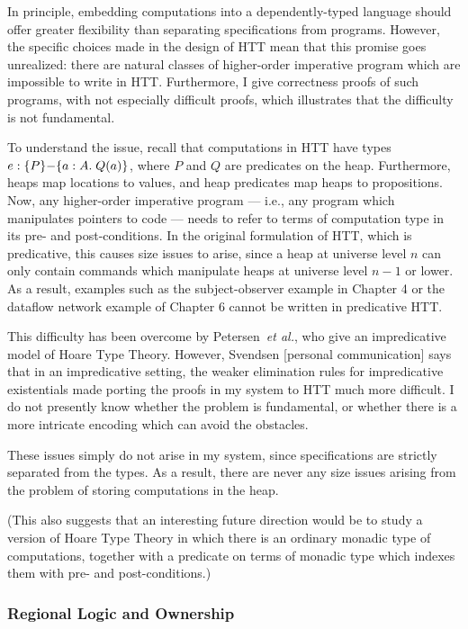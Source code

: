 In principle, embedding computations into a dependently-typed language
should offer greater flexibility than separating specifications from
programs. However, the specific choices made in the design of HTT mean
that this promise goes unrealized: there are natural classes of
higher-order imperative program which are impossible to write in
HTT. Furthermore, I give correctness proofs of such programs, with not
especially difficult proofs, which illustrates that the difficulty is
not fundamental.

To understand the issue, recall that computations in HTT have types $e
: \{{P}\}{-}\{{a:A}.\;{Q(a)}\}$, where $P$ and $Q$ are predicates on the
heap. Furthermore, heaps map locations to values, and heap predicates
map heaps to propositions. Now, any higher-order imperative program
--- i.e., any program which manipulates pointers to code --- needs to
refer to terms of computation type in its pre- and post-conditions.
In the original formulation of HTT, which is predicative, this causes
size issues to arise, since a heap at universe level $n$ can only
contain commands which manipulate heaps at universe level $n-1$ or
lower. As a result, examples such as the subject-observer example in
Chapter 4 or the dataflow network example of Chapter 6 cannot be
written in predicative HTT. 

This difficulty has been overcome by Petersen~\emph{et al.}, who give
an impredicative model of Hoare Type Theory. However, Svendsen
[personal communication] says that in an impredicative setting, the
weaker elimination rules for impredicative existentials made porting
the proofs in my system to HTT much more difficult. I do not presently
know whether the problem is fundamental, or whether there is a more
intricate encoding which can avoid the obstacles.
 
These issues simply do not arise in my system, since specifications
are strictly separated from the types. As a result, there are never
any size issues arising from the problem of storing computations in
the heap. 

(This also suggests that an interesting future direction would be to
study a version of Hoare Type Theory in which there is an ordinary
monadic type of computations, together with a predicate on terms of
monadic type which indexes them with pre- and post-conditions.)

\subsubsection{Regional Logic and Ownership}

